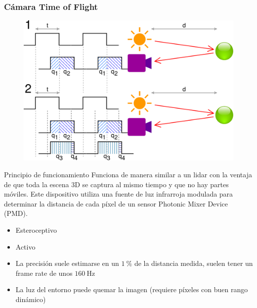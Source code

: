 \begin{frame}
    \frametitle{Cámara Time of Flight}
    \scriptsize
    
    \begin{figure}[!h]
        \includegraphics[width=0.4\columnwidth]{images/time_of_flight_camera.pdf}
    \end{figure}
    
    \begin{block}{Principio de funcionamiento}
        Funciona de manera similar a un lidar con la ventaja de que toda la escena 3D se captura al mismo tiempo y que no hay partes móviles. Este dispositivo utiliza una fuente de luz infrarroja modulada para determinar la distancia de cada píxel de un sensor Photonic Mixer Device (PMD).
    \end{block}
    
    \begin{itemize}
        \item Esteroceptivo
        \item Activo
        \item La precisión suele estimarse en un $\SI{1}{\percent}$ de la distancia medida, suelen tener un frame rate de unos $\SI{160}{\hertz}$
        \item La luz del entorno puede quemar la imagen (requiere píxeles con buen rango dinámico)
    \end{itemize}
    
\end{frame}
